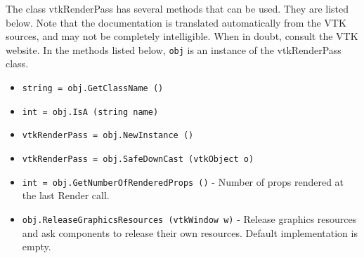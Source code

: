 The class vtkRenderPass has several methods that can be used.
  They are listed below.
Note that the documentation is translated automatically from the VTK sources,
and may not be completely intelligible.  When in doubt, consult the VTK website.
In the methods listed below, \verb|obj| is an instance of the vtkRenderPass class.
\begin{itemize}
\item  \verb|string = obj.GetClassName ()|

\item  \verb|int = obj.IsA (string name)|

\item  \verb|vtkRenderPass = obj.NewInstance ()|

\item  \verb|vtkRenderPass = obj.SafeDownCast (vtkObject o)|

\item  \verb|int = obj.GetNumberOfRenderedProps ()| -  Number of props rendered at the last Render call.

\item  \verb|obj.ReleaseGraphicsResources (vtkWindow w)| -  Release graphics resources and ask components to release their own
 resources. Default implementation is empty.
 

\end{itemize}
